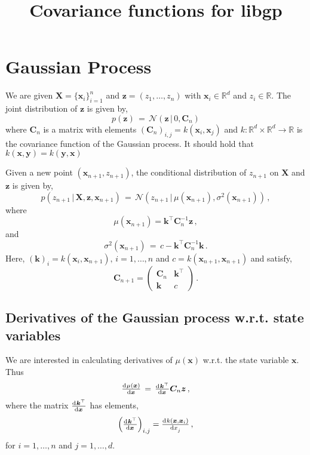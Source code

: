 \documentclass{article}
\title{Covariance functions for libgp}
\newcommand{\bx}{\bm{x}}
\newcommand{\bX}{\bm{X}}
\newcommand{\by}{\bm{y}}
\newcommand{\bz}{\bm{z}}
\newcommand{\bk}{\bm{k}}
\newcommand{\bC}{\bm{C}}
\newcommand{\R}{\mathbb{R}}
\newcommand{\NORMAL}{\mathcal{N}}
\begin{document}


\maketitle

\section{Gaussian Process}

We are given $\bX=\{\bx_i\}_{i=1}^n$ and $\bz=(z_1,\ldots,z_n)$ with $\bx_i \in \R^d$ and $z_i \in \R$. 
The joint distribution of $\bz$ is given by,
%
\begin{equation}
p(\bz) \,=\, \NORMAL \left( \bz \,|\,  0, \bC_n  \right)
\end{equation}
%
where $\bC_n$ is a matrix with elements $(\bC_n)_{i,j} = k(\bx_i,\bx_j)$ and $k: \R^d \times \R^d \rightarrow \R$ is the covariance function of the Gaussian process. It should hold that $k(\bx,\by) = k(\by,\bx)$
%


Given a new point $(\bx_{n+1},z_{n+1})$, the conditional distribution of $z_{n+1}$ on $\bX$ and $\bz$ is given by,
%
\begin{equation}
p(z_{n+1} \,|\, \bX,\bz,\bx_{n+1}) \,=\, \NORMAL \left( z_{n+1} \,|\,  \mu(\bx_{n+1}), \sigma^2(\bx_{n+1})  \right) \, ,
\end{equation}
%
where
%
\begin{equation}
 \mu(\bx_{n+1}) = \bk^\top \bC_n^{-1} \bz \, ,
\end{equation}
%
and
%
\begin{equation}
\sigma^2(\bx_{n+1}) \, = \,  c - \bk^\top \bC_n^{-1} \bk	\, .
\end{equation}
%
Here, $(\bk)_i = k(\bx_{i},\bx_{n+1}), \, i=1,\ldots,n$ and $c = k(\bx_{n+1},\bx_{n+1})$ and satisfy,
%
\begin{equation}
\bC_{n+1} = 
 \begin{pmatrix}
  \bC_{n} & \bk ^\top  \\
  \bk & c
 \end{pmatrix} \, .
\end{equation}



\subsection{Derivatives of the Gaussian process w.r.t. state variables}

We are interested in calculating derivatives of $\mu(\bx)$ w.r.t. the state variable $\bx$. Thus
%
\begin{equation}
\od{\mu(\bx)}{\bx} \, = \, \od{\bk^\top}{\bx} \bC_n \bz \, ,
\end{equation}
%
where the matrix $ \od{\bk^\top}{\bx}$ has elements,
%
\begin{equation}
\left ( \od{\bk^\top}{\bx} \right )_{i,j} = \od{k(\bx, \bx_i)}{x_j} \, ,
\end{equation}
%
for $i=1,\ldots,n$ and $j=1,\ldots,d$.
\end{document}
